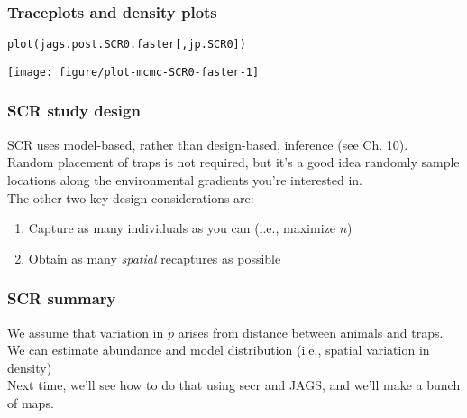 \documentclass[color=usenames,dvipsnames]{beamer}\usepackage[]{graphicx}\usepackage[]{color}
\makeatletter
\newcommand{\hlstd}[1]{\textcolor[rgb]{0,0,0}{#1}}%
\newcommand{\hlkwd}[1]{\textcolor[rgb]{0.004,0.004,0.506}{#1}}%
\newenvironment{kframe}{%
 \def\at@end@of@kframe{}%
 \ifinner\ifhmode%
  \def\at@end@of@kframe{\end{minipage}}%
  \begin{minipage}{\columnwidth}%
 \fi\fi%
 \def\FrameCommand##1{\hskip\@totalleftmargin \hskip-\fboxsep
 \colorbox{shadecolor}{##1}\hskip-\fboxsep
     \hskip-\linewidth \hskip-\@totalleftmargin \hskip\columnwidth}%
 \MakeFramed {\advance\hsize-\width
   \@totalleftmargin\z@ \linewidth\hsize
   \@setminipage}}%
 {\par\unskip\endMakeFramed%
 \at@end@of@kframe}
\newenvironment{knitrout}{}{} %
\makeatother
\begin{document}
\begin{frame}[fragile]
  \frametitle{Traceplots and density plots}
\begin{knitrout}\footnotesize
{}\color{fgcolor}\begin{kframe}
\begin{alltt}
\hlkwd{plot}\hlstd{(jags.post.SCR0.faster[,jp.SCR0])}
\end{alltt}
\end{kframe}

{\centering \texttt{[image: figure/plot-mcmc-SCR0-faster-1]} 

}



\end{knitrout}
\end{frame}




\begin{frame}
  \frametitle{SCR study design}
  SCR uses model-based, rather than design-based,
  inference (see Ch. 10). \\ 
  \pause
  \vfill
  Random placement of traps is not required, but it's a good idea
  randomly sample locations along the environmental gradients you're
  interested in. \\
  \pause \vfill
  The other two key design considerations are:
  \begin{enumerate}
    \item<3-> Capture as many individuals as you can (i.e., maximize $n$)
    \item<4-> Obtain as many {\it spatial} recaptures as possible
  \end{enumerate}
  \vfill
\end{frame}



\begin{frame}
  \frametitle{SCR summary}
  We assume that variation in $p$ arises from distance between animals
  and traps. \\
  \pause \vfill
  We can estimate abundance and model distribution (i.e., spatial
  variation in density) \\
  \pause \vfill
  Next time, we'll see how to do that using secr and JAGS, and we'll
  make a bunch of maps. \\
\end{frame}
\end{document}
